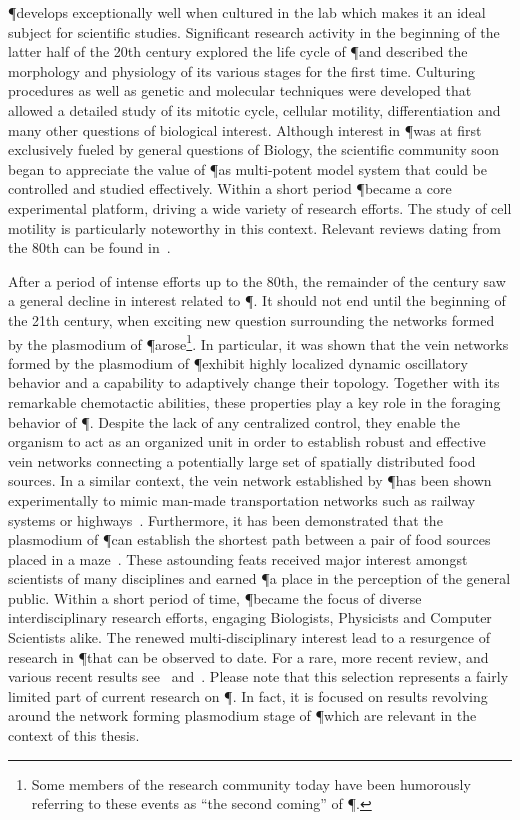 		\P develops exceptionally well when cultured in the lab which makes it an ideal subject for scientific studies. Significant research activity in the beginning of the latter half of the 20th century explored the life cycle of \P and described the morphology and physiology of its various stages for the first time. Culturing procedures as well as genetic and molecular techniques were developed that allowed a detailed study of its mitotic cycle, cellular motility, differentiation and many other questions of biological interest. Although interest in \P was at first exclusively fueled by general questions of Biology, the scientific community soon began to appreciate the value of \P as multi-potent model system that could be controlled and studied effectively. Within a short period \P became a core experimental platform, driving a wide variety of research efforts. The study of cell motility is particularly noteworthy in this context. Relevant reviews dating from the 80th can be found in~\cite{dove1980growth, aldrich2012cell,sauer1982developmental,Sauer1986}.

		After a period of intense efforts up to the 80th, the remainder of the century saw a general decline in interest related to \P. It should not end until the beginning of the 21th century, when exciting new question surrounding the networks formed by the plasmodium of \P arose\footnote{Some members of the research community today have been humorously referring to these events as ``the second coming'' of \P.}. In particular, it was shown that the vein networks formed by the plasmodium of \P exhibit highly localized dynamic oscillatory behavior and a capability to adaptively change their topology. Together with its remarkable chemotactic abilities, these properties play a key role in the foraging behavior of \P. Despite the lack of any centralized control, they enable the organism to act as an organized unit in order to establish robust and effective vein networks connecting a potentially large set of spatially distributed food sources. In a similar context, the vein network established by \P has been shown experimentally to mimic man-made transportation networks such as railway systems or highways~\cite{tero2010rules,tero2006physarum,nakagaki2004smart}. Furthermore, it has been demonstrated that the plasmodium of \P can establish the shortest path between a pair of food sources placed in a maze~\cite{nakagaki2000intelligence}. These astounding feats received major interest amongst scientists of many disciplines and earned \P a place in the perception of the general public. Within a short period of time, \P became the focus of diverse interdisciplinary research efforts, engaging Biologists, Physicists and Computer Scientists alike. The renewed multi-disciplinary interest lead to a resurgence of research in \P that can be observed to date. For a rare, more recent review, and various recent results see~\cite{ueda2005intelligent} and~\cite{takamatsu2009environment,shirakawa2007emergence,alim2013random,Tero2007553,nakagaki2004obtaining}. Please note that this selection represents a fairly limited part of current research on \P. In fact, it is focused on results revolving around the network forming plasmodium stage of \P which are relevant in the context of this thesis.

		\FloatBarrier
